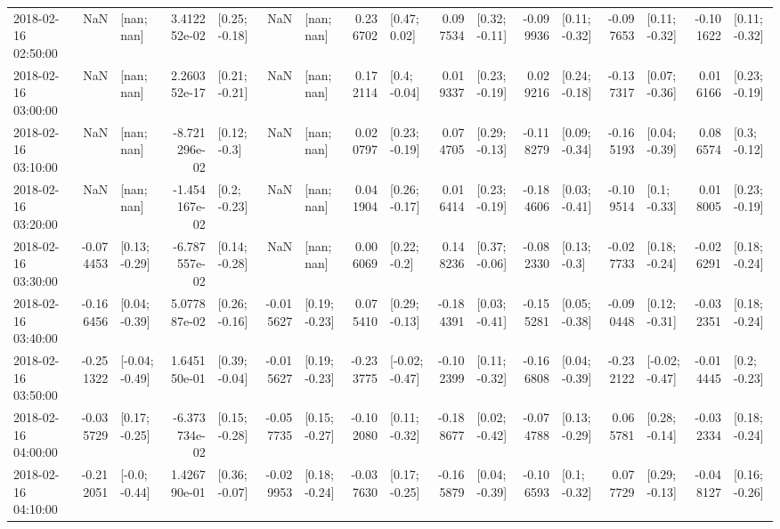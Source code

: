 \begin{tabular}{lrlrlrlrlrlrlrlrl}
2018-02-16 02:50:00 &       NaN &      [nan; nan] &  3.412252e-02 &   [0.25; -0.18] &       NaN &      [nan; nan] &  0.236702 &    [0.47; 0.02] &  0.097534 &   [0.32; -0.11] & -0.099936 &   [0.11; -0.32] & -0.097653 &   [0.11; -0.32] & -0.101622 &   [0.11; -0.32] \\
2018-02-16 03:00:00 &       NaN &      [nan; nan] &  2.260352e-17 &   [0.21; -0.21] &       NaN &      [nan; nan] &  0.172114 &    [0.4; -0.04] &  0.019337 &   [0.23; -0.19] &  0.029216 &   [0.24; -0.18] & -0.137317 &   [0.07; -0.36] &  0.016166 &   [0.23; -0.19] \\
2018-02-16 03:10:00 &       NaN &      [nan; nan] & -8.721296e-02 &    [0.12; -0.3] &       NaN &      [nan; nan] &  0.020797 &   [0.23; -0.19] &  0.074705 &   [0.29; -0.13] & -0.118279 &   [0.09; -0.34] & -0.165193 &   [0.04; -0.39] &  0.086574 &    [0.3; -0.12] \\
2018-02-16 03:20:00 &       NaN &      [nan; nan] & -1.454167e-02 &    [0.2; -0.23] &       NaN &      [nan; nan] &  0.041904 &   [0.26; -0.17] &  0.016414 &   [0.23; -0.19] & -0.184606 &   [0.03; -0.41] & -0.109514 &    [0.1; -0.33] &  0.018005 &   [0.23; -0.19] \\
2018-02-16 03:30:00 & -0.074453 &   [0.13; -0.29] & -6.787557e-02 &   [0.14; -0.28] &       NaN &      [nan; nan] &  0.006069 &    [0.22; -0.2] &  0.148236 &   [0.37; -0.06] & -0.082330 &    [0.13; -0.3] & -0.027733 &   [0.18; -0.24] & -0.026291 &   [0.18; -0.24] \\
2018-02-16 03:40:00 & -0.166456 &   [0.04; -0.39] &  5.077887e-02 &   [0.26; -0.16] & -0.015627 &   [0.19; -0.23] &  0.075410 &   [0.29; -0.13] & -0.184391 &   [0.03; -0.41] & -0.155281 &   [0.05; -0.38] & -0.090448 &   [0.12; -0.31] & -0.032351 &   [0.18; -0.24] \\
2018-02-16 03:50:00 & -0.251322 &  [-0.04; -0.49] &  1.645150e-01 &   [0.39; -0.04] & -0.015627 &   [0.19; -0.23] & -0.233775 &  [-0.02; -0.47] & -0.102399 &   [0.11; -0.32] & -0.166808 &   [0.04; -0.39] & -0.232122 &  [-0.02; -0.47] & -0.014445 &    [0.2; -0.23] \\
2018-02-16 04:00:00 & -0.035729 &   [0.17; -0.25] & -6.373734e-02 &   [0.15; -0.28] & -0.057735 &   [0.15; -0.27] & -0.102080 &   [0.11; -0.32] & -0.188677 &   [0.02; -0.42] & -0.074788 &   [0.13; -0.29] &  0.065781 &   [0.28; -0.14] & -0.032334 &   [0.18; -0.24] \\
2018-02-16 04:10:00 & -0.212051 &   [-0.0; -0.44] &  1.426790e-01 &   [0.36; -0.07] & -0.029953 &   [0.18; -0.24] & -0.037630 &   [0.17; -0.25] & -0.165879 &   [0.04; -0.39] & -0.106593 &    [0.1; -0.32] &  0.077729 &   [0.29; -0.13] & -0.048127 &   [0.16; -0.26] \\

\end{tabular}
